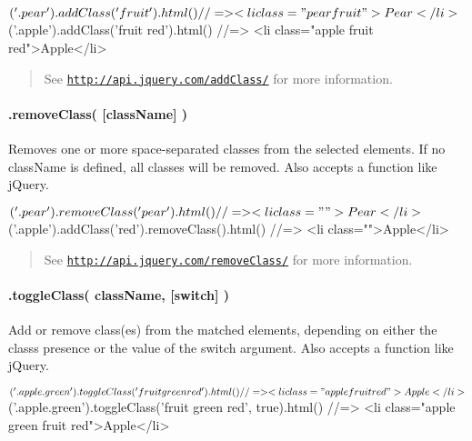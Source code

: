 \begin{DoxyCode}
$('.pear').addClass('fruit').html()
//=> <li class="pear fruit">Pear</li>

$('.apple').addClass('fruit red').html()
//=> <li class="apple fruit red">Apple</li>
\end{DoxyCode}


\begin{quote}
See \href{http://api.jquery.com/addClass/}{\tt http\+://api.\+jquery.\+com/add\+Class/} for more information. \end{quote}


\paragraph*{.remove\+Class( \mbox{[}class\+Name\mbox{]} )}

Removes one or more space-\/separated classes from the selected elements. If no {\ttfamily class\+Name} is defined, all classes will be removed. Also accepts a {\ttfamily function} like j\+Query.


\begin{DoxyCode}
$('.pear').removeClass('pear').html()
//=> <li class="">Pear</li>

$('.apple').addClass('red').removeClass().html()
//=> <li class="">Apple</li>
\end{DoxyCode}


\begin{quote}
See \href{http://api.jquery.com/removeClass/}{\tt http\+://api.\+jquery.\+com/remove\+Class/} for more information. \end{quote}


\paragraph*{.toggle\+Class( class\+Name, \mbox{[}switch\mbox{]} )}

Add or remove class(es) from the matched elements, depending on either the class\textquotesingle{}s presence or the value of the switch argument. Also accepts a {\ttfamily function} like j\+Query.


\begin{DoxyCode}
$('.apple.green').toggleClass('fruit green red').html()
//=> <li class="apple fruit red">Apple</li>

$('.apple.green').toggleClass('fruit green red', true).html()
//=> <li class="apple green fruit red">Apple</li>
\end{DoxyCode}


